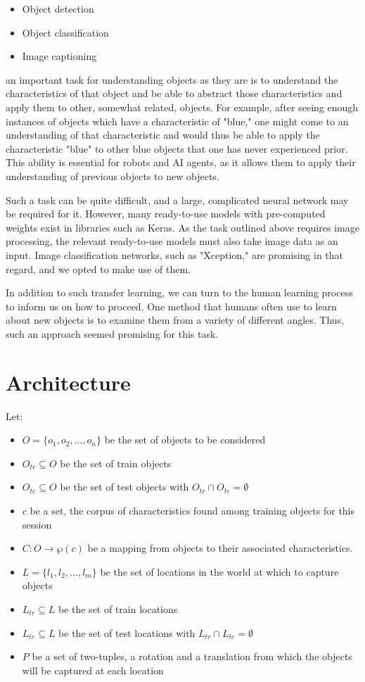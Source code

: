 \documentclass{article}
\begin{document}
\begin{itemize}
	\item Object detection
	\item Object classification
	\item Image captioning
\end{itemize}

an important task for understanding objects as they are is to understand the characteristics of that object and be able to abstract those characteristics and apply them to other, somewhat related, objects. For example, after seeing enough instances of objects which have a characteristic of "blue," one might come to an understanding of that characteristic and would thus be able to apply the characteristic "blue" to other blue objects that one has never experienced prior. This ability is essential for robots and AI agents, as it allows them to apply their understanding of previous objects to new objects.

Such a task can be quite difficult, and a large, complicated neural network may be required for it. However, many ready-to-use models with pre-computed weights exist in libraries such as Keras. As the task outlined above requires image processing, the relevant ready-to-use models must also take image data as an input. Image classification networks, such as "Xception," are promising in that regard, and we opted to make use of them.

In addition to such transfer learning, we can turn to the human learning process to inform us on how to proceed. One method that humans often use to learn about new objects is to examine them from a variety of different angles. Thus, such an approach seemed promising for this task.

\section{Architecture}

Let:

\begin{itemize}
	\item $ O = \{o_1, o_2, ..., o_n\} $ be the set of objects to be considered
	\item $ O_{tr} \subseteq O $ be the set of train objects
	\item $ O_{te} \subseteq O $ be the set of test objects with $ O_{tr} \cap O_{te} = \emptyset $
	\item $ c $ be a set, the corpus of characteristics found among training objects for this session
	\item $ C: O \rightarrow \wp(c) $ be a mapping from objects to their associated characteristics.
	\item $ L = \{l_1, l_2, ..., l_m\} $ be the set of locations in the world at which to capture objects
	\item $ L_{tr} \subseteq L $ be the set of train locations
	\item $ L_{te} \subseteq L $ be the set of test locations with $ L_{tr} \cap L_{te} = \emptyset $
	\item $ P $ be a set of two-tuples, a rotation and a translation from which the objects will be captured at each location
\end{itemize}
\end{document}

